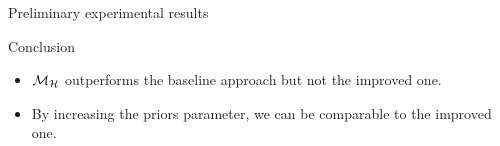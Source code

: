 \documentclass[final,hyperref={pdfpagelabels=false}]{beamer}
\begin{document}
\begin{frame}[t]
\begin{columns}[t]
\begin{column}{.485\textwidth}
\begin{block}{Preliminary experimental results}
\begin{figure}[H]
\end{figure}


\end{block}




\begin{block}{Conclusion}

\begin{itemize}
  \item  $\mathcal{M}_{\mathcal{H}}$ outperforms the baseline approach but not the improved one.
  \item By increasing the priors parameter, we can be comparable to the improved one.
    


\end{itemize}
\end{block}









\end{column}
\end{columns}
\end{frame}
\end{document}
